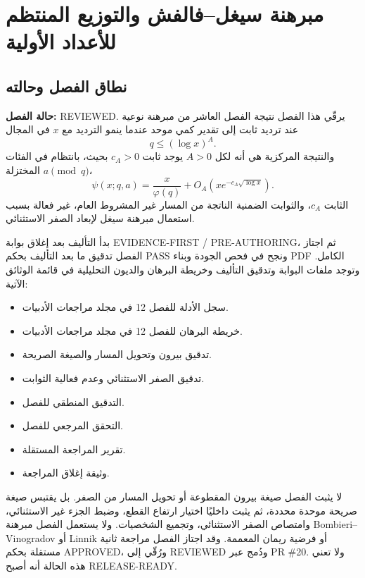 \chapter{مبرهنة سيغل--فالفش والتوزيع المنتظم للأعداد الأولية}

\section{نطاق الفصل وحالته}

\noindent\textbf{حالة الفصل:} \textenglish{REVIEWED}. يرقّي هذا الفصل نتيجة
الفصل العاشر من مبرهنة نوعية عند ترديد ثابت إلى تقدير كمي موحد عندما ينمو
الترديد مع \(x\) في المجال
\[
q\le (\log x)^A.
\]
والنتيجة المركزية هي أنه لكل \(A>0\) يوجد ثابت \(c_A>0\) بحيث، بانتظام في
الفئات المختزلة \(a\pmod q\)،
\[
\psi(x;q,a)
=
\frac{x}{\varphi(q)}
+O_A\!\left(xe^{-c_A\sqrt{\log x}}\right).
\]
الثابت \(c_A\)، والثوابت الضمنية الناتجة من المسار غير المشروط العام، غير
فعالة بسبب استعمال مبرهنة سيغل لإبعاد الصفر الاستثنائي.

بدأ التأليف بعد إغلاق بوابة
\textenglish{EVIDENCE-FIRST / PRE-AUTHORING}، ثم اجتاز الفصل تدقيق ما بعد
التأليف بحكم \textenglish{PASS} ونجح في فحص الجودة وبناء PDF الكامل.
وتوجد ملفات البوابة وتدقيق التأليف وخريطة البرهان والديون التحليلية في
قائمة الوثائق الآتية:
\begin{itemize}
  \item سجل الأدلة للفصل 12 في مجلد مراجعات الأدبيات.
  \item خريطة البرهان للفصل 12 في مجلد مراجعات الأدبيات.
  \item تدقيق بيرون وتحويل المسار والصيغة الصريحة.
  \item تدقيق الصفر الاستثنائي وعدم فعالية الثوابت.
  \item التدقيق المنطقي للفصل.
  \item التحقق المرجعي للفصل.
  \item تقرير المراجعة المستقلة.
  \item وثيقة إغلاق المراجعة.
\end{itemize}

لا يثبت الفصل صيغة بيرون المقطوعة أو تحويل المسار من الصفر. بل يقتبس صيغة
صريحة موحدة محددة، ثم يثبت داخليًا اختيار ارتفاع القطع، وضبط الجزء غير
الاستثنائي، وامتصاص الصفر الاستثنائي، وتجميع الشخصيات. ولا يستعمل الفصل
مبرهنة Bombieri--Vinogradov أو Linnik أو فرضية ريمان المعممة. وقد اجتاز
الفصل مراجعة ثانية مستقلة بحكم \textenglish{APPROVED}، ورُقّي إلى
\textenglish{REVIEWED} ودُمج عبر PR \#20. ولا تعني هذه الحالة أنه أصبح
\textenglish{RELEASE-READY}.

